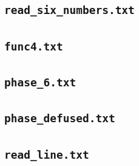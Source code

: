 
\subsection{\texttt{read_six_numbers.txt}}\label{read-six-numbers}


\subsection{\texttt{func4.txt}}\label{func4}


\subsection{\texttt{phase_6.txt}}\label{phase6}


\subsection{\texttt{phase_defused.txt}}\label{phase-defused}


\subsection{\texttt{read_line.txt}}\label{readline}


